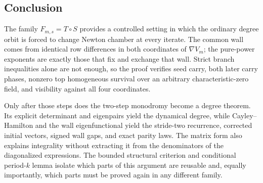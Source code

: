 \documentclass[11pt]{article}
\theoremstyle{definition}
\theoremstyle{remark}
\begin{document}
\subsection{Conclusion}

The family \(F_{m,s}=T\circ S\) provides a controlled setting in which the
ordinary degree orbit is forced to change Newton chamber at every iterate.
The common wall comes from identical row differences in both coordinates of
\(\nabla V_m\); the pure-power exponents are exactly those that fix and
exchange that wall.  Strict branch inequalities alone are not enough, so the
proof verifies seed carry, both later carry phases, nonzero top homogeneous
survival over an arbitrary characteristic-zero field, and visibility against
all four coordinates.

Only after those steps does the two-step monodromy become a degree theorem.
Its explicit determinant and eigenpairs yield the dynamical degree, while
Cayley--Hamilton and the wall eigenfunctional yield the stride-two
recurrence, corrected initial vectors, signed wall gaps, and exact parity
laws.  The matrix form also explains integrality without extracting it from
the denominators of the diagonalized expressions.  The bounded structural
criterion and conditional period-\(k\) lemma isolate which parts of this
argument are reusable and, equally importantly, which parts must be proved
again in any different family.

\clearpage


\end{document}
